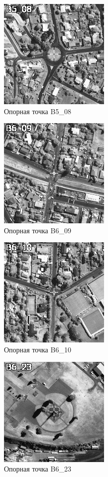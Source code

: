 \documentclass[
  12pt,
]{book}
\begin{document}
\begin{figure}
\centering
\includegraphics{images/Ref17/B5_08.jpeg}
\caption{Опорная точка B5\_08}
\end{figure}

\begin{figure}
\centering
\includegraphics{images/Ref17/B6_09.jpeg}
\caption{Опорная точка B6\_09}
\end{figure}

\begin{figure}
\centering
\includegraphics{images/Ref17/B6_10.jpeg}
\caption{Опорная точка B6\_10}
\end{figure}

\begin{figure}
\centering
\includegraphics{images/Ref17/B6_23.jpeg}
\caption{Опорная точка B6\_23}
\end{figure}
\end{document}
